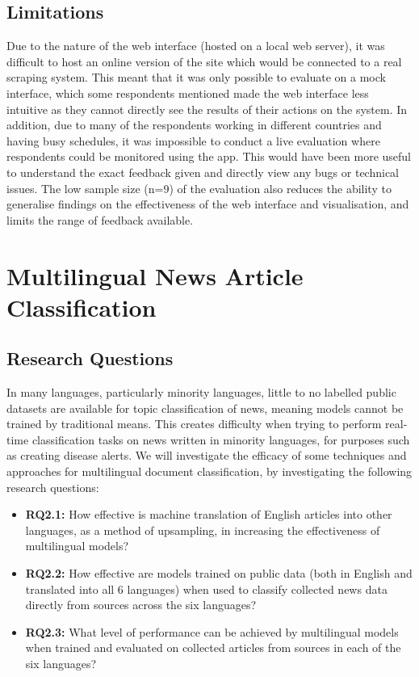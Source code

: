 \documentclass{l4proj}
\begin{document}
\subsection{Limitations}
Due to the nature of the web interface (hosted on a local web server), it was difficult to host an online version of the site which would be connected to a real scraping system. This meant that it was only possible to evaluate on a mock interface, which some respondents mentioned made the web interface less intuitive as they cannot directly see the results of their actions on the system. In addition, due to many of the respondents working in different countries and having busy schedules, it was impossible to conduct a live evaluation where respondents could be monitored using the app. This would have been more useful to understand the exact feedback given and directly view any bugs or technical issues. The low sample size (n=9) of the evaluation also reduces the ability to generalise findings on the effectiveness of the web interface and visualisation, and limits the range of feedback available.



\section{Multilingual News Article Classification}

\subsection{Research Questions}
In many languages, particularly minority languages, little to no labelled public datasets are available for topic classification of news, meaning models cannot be trained by traditional means. This creates difficulty when trying to perform real-time classification tasks on news written in minority languages, for purposes such as creating disease alerts. We will investigate the efficacy of some techniques and approaches for multilingual document classification, by investigating the following research questions: 
\begin{itemize}
\item \textbf{RQ2.1: }How effective is machine translation of English articles into other languages, as a method of upsampling, in increasing the effectiveness of multilingual models? 
\item \textbf{RQ2.2: }How effective are models trained on public data (both in English and translated into all 6 languages) when used to classify collected news data directly from sources across the six languages? 
\item \textbf{RQ2.3: }What level of performance can be achieved by multilingual models when trained and evaluated on collected articles from sources in each of the six languages?
\end{itemize}
\end{document}
